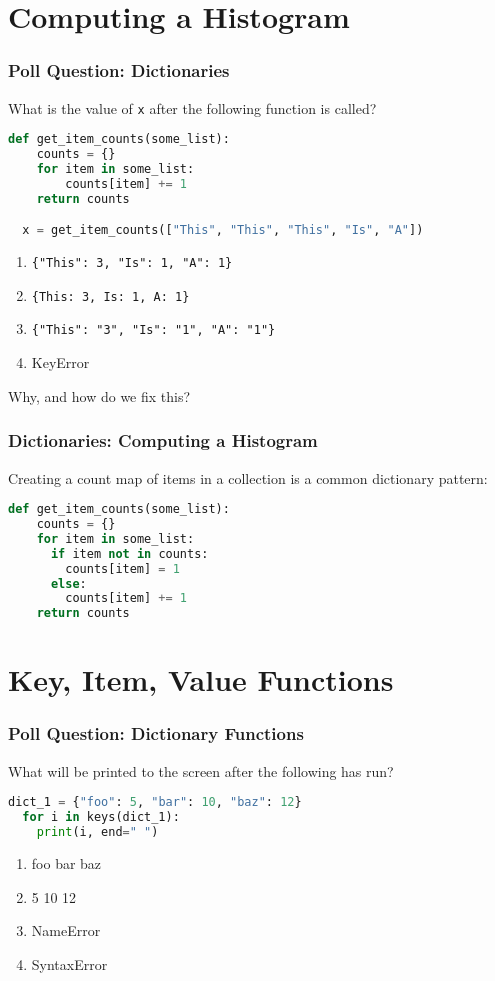 \documentclass{beamer}
\begin{document}
%
%
\section{Computing a Histogram}
\begin{frame}[fragile]
  \frametitle{Poll Question: Dictionaries}
  What is the value of \lstinline|x| after the following function is called?
  \begin{lstlisting}[language=Python, autogobble]
  def get_item_counts(some_list):
    counts = {}
    for item in some_list:
        counts[item] += 1
    return counts

  x = get_item_counts(["This", "This", "This", "Is", "A"])
  \end{lstlisting}
  \vfill
  \begin{enumerate}
    \item \lstinline|{"This": 3, "Is": 1, "A": 1}|
    \item \lstinline|{This: 3, Is: 1, A: 1}|
    \item \lstinline|{"This": "3", "Is": "1", "A": "1"}|
    \item KeyError
  \end{enumerate}
  \pause
  Why, and how do we fix this?
\end{frame}

%
%
\begin{frame}[fragile]
  \frametitle{Dictionaries: Computing a Histogram}
  Creating a count map of items in a collection is a common dictionary pattern:
  \begin{lstlisting}[language=Python, autogobble]
  def get_item_counts(some_list):
    counts = {}
    for item in some_list:
      if item not in counts:
        counts[item] = 1
      else:
        counts[item] += 1
    return counts
  \end{lstlisting}
\end{frame}

%
%
\section{Key, Item, Value Functions}
\begin{frame}[fragile]
  \frametitle{Poll Question: Dictionary Functions}
  What will be printed to the screen after the following has run?
  \begin{lstlisting}[language=Python, autogobble]
  dict_1 = {"foo": 5, "bar": 10, "baz": 12}
  for i in keys(dict_1):
    print(i, end=" ")
  \end{lstlisting}
  \vfill
  \begin{enumerate}[A]
    \item foo bar baz
    \item 5 10 12 
    \item NameError
    \item SyntaxError
  \end{enumerate}
\end{frame}
\end{document}
